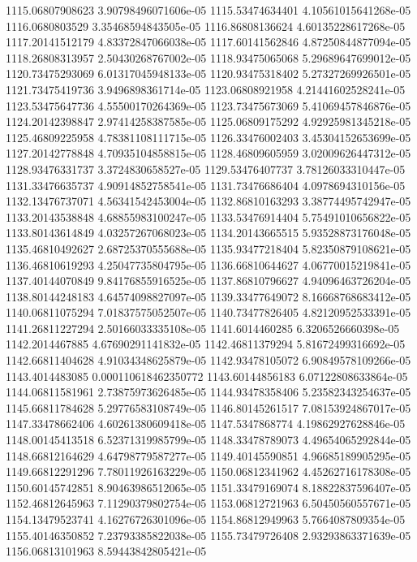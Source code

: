 {1115.06807908623 3.90798496071606e-05
1115.53474634401 4.10561015641268e-05
1116.0680803529 3.35468594843505e-05
1116.86808136624 4.60135228617268e-05
1117.20141512179 4.83372847066038e-05
1117.60141562846 4.87250844877094e-05
1118.26808313957 2.50430268767002e-05
1118.93475065068 5.29689647699012e-05
1120.73475293069 6.01317045948133e-05
1120.93475318402 5.27327269926501e-05
1121.73475419736 3.9496898361714e-05
1123.06808921958 4.21441602528241e-05
1123.53475647736 4.55500170264369e-05
1123.73475673069 5.41069457846876e-05
1124.20142398847 2.97414258387585e-05
1125.06809175292 4.92925981345218e-05
1125.46809225958 4.78381108111715e-05
1126.33476002403 3.45304152653699e-05
1127.20142778848 4.70935104858815e-05
1128.46809605959 3.02009626447312e-05
1128.93476331737 3.3724830658527e-05
1129.53476407737 3.78126033310447e-05
1131.33476635737 4.90914852758541e-05
1131.73476686404 4.0978694310156e-05
1132.13476737071 4.56341542453004e-05
1132.86810163293 3.38774495742947e-05
1133.20143538848 4.68855983100247e-05
1133.53476914404 5.75491010656822e-05
1133.80143614849 4.03257267068023e-05
1134.20143665515 5.93528873176048e-05
1135.46810492627 2.68725370555688e-05
1135.93477218404 5.82350879108621e-05
1136.46810619293 4.25047735804795e-05
1136.66810644627 4.06770015219841e-05
1137.40144070849 9.84176855916525e-05
1137.86810796627 4.94096463726204e-05
1138.80144248183 4.64574098827097e-05
1139.33477649072 8.16668768683412e-05
1140.06811075294 7.01837575052507e-05
1140.73477826405 4.82120952533391e-05
1141.26811227294 2.50166033335108e-05
1141.6014460285 6.3206526660398e-05
1142.2014467885 4.67690291141832e-05
1142.46811379294 5.81672499316692e-05
1142.66811404628 4.91034348625879e-05
1142.93478105072 6.90849578109266e-05
1143.4014483085 0.000110618462350772
1143.60144856183 6.07122808633864e-05
1144.06811581961 2.73875973626485e-05
1144.93478358406 5.23582343254637e-05
1145.66811784628 5.29776583108749e-05
1146.80145261517 7.08153924867017e-05
1147.33478662406 4.60261380609418e-05
1147.5347868774 4.19862927628846e-05
1148.00145413518 6.52371319985799e-05
1148.33478789073 4.49654065292844e-05
1148.66812164629 4.64798779587277e-05
1149.40145590851 4.96685189905295e-05
1149.66812291296 7.78011926163229e-05
1150.06812341962 4.45262716178308e-05
1150.60145742851 8.90463986512065e-05
1151.33479169074 8.18822837596407e-05
1152.46812645963 7.11290379802754e-05
1153.06812721963 6.50450560557671e-05
1154.13479523741 4.16276726301096e-05
1154.86812949963 5.7664087809354e-05
1155.40146350852 7.23793385822038e-05
1155.73479726408 2.93293863371639e-05
1156.06813101963 8.59443842805421e-05
}
